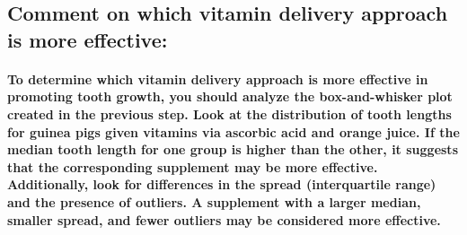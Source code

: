 \subsection{Comment on which vitamin delivery approach is more effective:}
\paragraph{To determine which vitamin delivery approach is more effective in promoting tooth growth, you should analyze the box-and-whisker plot created in the previous step. Look at the distribution of tooth lengths for guinea pigs given vitamins via ascorbic acid and orange juice.
If the median tooth length for one group is higher than the other, it suggests that the corresponding supplement may be more effective.
Additionally, look for differences in the spread (interquartile range) and the presence of outliers. A supplement with a larger median, smaller spread, and fewer outliers may be considered more effective.}